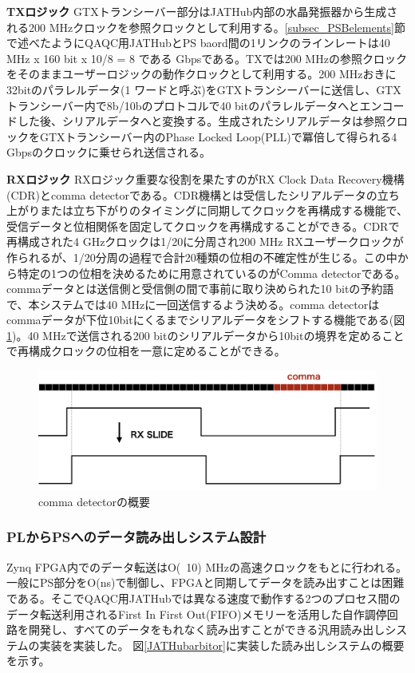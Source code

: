 \textbf{TXロジック}
\baselineskip
GTXトランシーバー部分はJATHub内部の水晶発振器から生成される200 MHzクロックを参照クロックとして利用する。\ref{subsec_PSBelements}節で述べたようにQAQC用JATHubとPS baord間の1リンクのラインレートは40 MHz x 160 bit x 10/8 = 8 である Gbpsである。TXでは200 MHzの参照クロックをそのままユーザーロジックの動作クロックとして利用する。200 MHzおきに32bitのパラレルデータ(1 ワードと呼ぶ)をGTXトランシーバーに送信し、GTXトランシーバー内で8b/10bのプロトコルで40 bitのパラレルデータへとエンコードした後、シリアルデータへと変換する。生成されたシリアルデータは参照クロックをGTXトランシーバー内のPhase Locked Loop(PLL)で冪倍して得られる4 Gbpsのクロックに乗せられ送信される。
\baselineskip

\textbf{RXロジック}
RXロジック重要な役割を果たすのがRX Clock Data Recovery機構(CDR)とcomma detectorである。CDR機構とは受信したシリアルデータの立ち上がりまたは立ち下がりのタイミングに同期してクロックを再構成する機能で、受信データと位相関係を固定してクロックを再構成することができる。CDRで再構成された4 GHzクロックは1/20に分周され200 MHz RXユーザークロックが作られるが、1/20分周の過程で合計20種類の位相の不確定性が生じる。この中から特定の1つの位相を決めるために用意されているのがComma detectorである。commaデータとは送信側と受信側の間で事前に取り決められた10 bitの予約語で、本システムでは40 MHzに一回送信するよう決める。comma detectorはcommaデータが下位10bitにくるまでシリアルデータをシフトする機能である(図\ref{JATHubcomma})。40 MHzで送信される200 bitのシリアルデータから10bitの境界を定めることで再構成クロックの位相を一意に定めることができる。

\begin{figure} 
\centering
\includegraphics[width=16cm]{fig/JATHubcomma.png}
\caption[comma detectorの概要]{comma detectorの概要}
\label{JATHubcomma}
\end{figure}
\baselineskip


\subsubsection{PLからPSへのデータ読み出しシステム設計}
\label{subsubsec_readout}
Zynq FPGA内でのデータ転送はO(~10) MHzの高速クロックをもとに行われる。一般にPS部分をO(ns)で制御し、FPGAと同期してデータを読み出すことは困難である。そこでQAQC用JATHubでは異なる速度で動作する2つのプロセス間のデータ転送利用されるFirst In First Out(FIFO)メモリーを活用した自作調停回路を開発し、すべてのデータをもれなく読み出すことができる汎用読み出しシステムの実装を実装した。
図\ref{JATHubarbitor}に実装した読み出しシステムの概要を示す。

